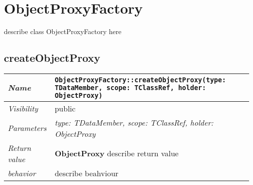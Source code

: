 \chapter{ObjectProxyFactory}
describe class ObjectProxyFactory here
\section{createObjectProxy}
\begin{longtable}{p{3cm} @{\hskip 1cm} p{12cm}}
 \hline
\textit{Name} & \texttt{ObjectProxyFactory::createObjectProxy(type: TDataMember, scope: TClassRef, holder: ObjectProxy)}\\
\hline
 \textit{Visibility} & public\\
\hline
\textit{Parameters} & \textit{type: TDataMember, scope: TClassRef, holder: ObjectProxy}\\
\hline
\textit{Return value} & \textbf{ ObjectProxy} describe return value\\
  \hline
 \textit{behavior} & describe beahviour \\
\hline
\end{longtable} \pagebreak
 